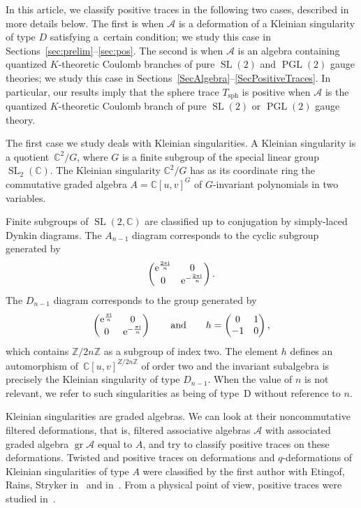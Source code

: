 \documentclass[pdftex]{sigma}
\newcommand\ZZ{\mathbb{Z}}
\newcommand\CC{\mathbb{C}}
\newcommand\cA{\mathcal{A}}
\DeclareMathOperator\gr{gr}
\DeclareMathOperator\SL{SL}
\newcommand{\mc}{\mathcal}
\newcommand{\PGL}{\operatorname{PGL}}
\numberwithin{equation}{section}
\theoremstyle{definition}
\begin{document}
In this article, we classify positive traces in the following two cases, described in more details below. The first is when $\mc{A}$ is a deformation of a Kleinian singularity of type $D$ satisfying a~certain condition; we study this case in Sections~\ref{sec:prelim}--\ref{sec:pos}. The second is when $\mc{A}$ is an algebra containing quantized $K$-theoretic Coulomb branches of pure $\SL(2)$ and $\PGL(2)$ gauge theories; we study this case in Sections~\ref{SecAlgebra}--\ref{SecPositiveTraces}.
In particular, our results imply that the sphere trace $T_{\text{sph}}$ is positive when $\mc{A}$ is the quantized $K$-theoretic Coulomb branch of pure $\SL(2)$ or $\PGL(2)$ gauge theory.

The first case we study deals with Kleinian singularities.
A Kleinian singularity is a quotient~$\CC^2 / G$,
where $G$ is a finite subgroup
of the special linear group $\SL_2(\CC)$.
The Kleinian singularity $\CC^2 / G$
has as its coordinate ring
the commutative graded algebra $A = \CC[u, v]^G$
of $G$-invariant polynomials in two variables.


Finite subgroups of $\SL(2,\CC)$ are classified up to conjugation by simply-laced Dynkin diagrams. The $A_{n-1}$ diagram corresponds to the cyclic subgroup generated by
\[
 \begin{pmatrix}
 {\rm e}^{\frac{2\pi {\rm i}}{n}} & 0\\
 0 & {\rm e}^{-\frac{2\pi {\rm i}}{n}}
 \end{pmatrix}.
\]
The $D_{n-1}$ diagram corresponds to the group generated by
\[
 \begin{pmatrix}
 {\rm e}^{\frac{\pi {\rm i}}{n}} & 0\\
 0 & {\rm e}^{-\frac{\pi {\rm i}}{n}}
 \end{pmatrix} \qquad \text{and} \qquad h=\begin{pmatrix}
 0 & 1\\
 -1 & 0
 \end{pmatrix},
\]
which contains $\ZZ/2n\ZZ$ as a subgroup of index two. The element $h$ defines an automorphism of~$\CC[u,v]^{Z/2n\ZZ}$ of order two and the invariant subalgebra is precisely the Kleinian singularity of type $D_{n - 1}$.
When the value of $n$ is not relevant,
we refer to such singularities as being of type~D
without reference to $n$.

Kleinian singularities are graded algebras. We can look at their noncommutative filtered deformations, that is, filtered associative algebras $\cA$
with associated graded algebra $\gr \cA$ equal to $A$,
and try to classify positive traces on these deformations.
Twisted and positive traces on deformations and $q$-deformations of Kleinian singularities of type $A$ were classified by the first author with Etingof, Rains, Stryker in~\cite{etingof2021twisted} and in~\cite{KQWeyl}. From a physical point of view, positive traces were studied in~\cite{ DFPY, DFPYCoulomb, DG,DPY}.
\end{document}

